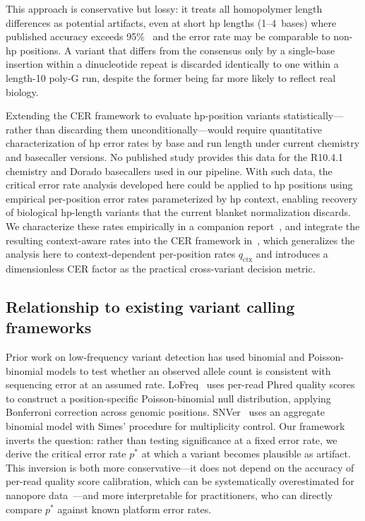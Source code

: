 \documentclass[11pt]{article}
\begin{document}
This approach is conservative but lossy: it treats all homopolymer length
differences as potential artifacts, even at short hp lengths (1--4~bases) where
published accuracy exceeds 95\%~\cite{sereika2022} and the error rate may be
comparable to non-hp positions. A variant that differs from the consensus only by
a single-base insertion within a dinucleotide repeat is discarded identically to
one within a length-10 poly-G run, despite the former being far more likely to
reflect real biology.

Extending the CER framework to evaluate hp-position variants statistically---rather
than discarding them unconditionally---would require quantitative characterization
of hp error rates by base and run length under current chemistry and basecaller
versions. No published study provides this data for the R10.4.1 chemistry and
Dorado basecallers used in our pipeline. With such data, the critical error rate
analysis developed here could be applied to hp positions using empirical
per-position error rates parameterized by hp context, enabling recovery of
biological hp-length variants that the current blanket normalization discards.
We characterize these rates empirically in a companion report~\cite{hp_paper},
and integrate the resulting context-aware rates into the CER framework
in~\cite{cer_practice}, which generalizes the analysis here to context-dependent
per-position rates $q_\text{ctx}$ and introduces a dimensionless CER factor
as the practical cross-variant decision metric.

\subsection{Relationship to existing variant calling frameworks}

Prior work on low-frequency variant detection has used binomial and
Poisson-binomial models to test whether an observed allele count is consistent
with sequencing error at an assumed rate. LoFreq~\cite{wilm2012} uses per-read
Phred quality scores to construct a position-specific Poisson-binomial null
distribution, applying Bonferroni correction across genomic positions.
SNVer~\cite{wei2011} uses an aggregate binomial model with Simes' procedure for
multiplicity control. Our framework inverts the question: rather than testing
significance at a fixed error rate, we derive the critical error rate $p^*$ at
which a variant becomes plausible as artifact. This inversion is both more
conservative---it does not depend on the accuracy of per-read quality score
calibration, which can be systematically overestimated for nanopore
data~\cite{delahaye2021}---and more interpretable for practitioners, who can
directly compare $p^*$ against known platform error rates.
\end{document}
